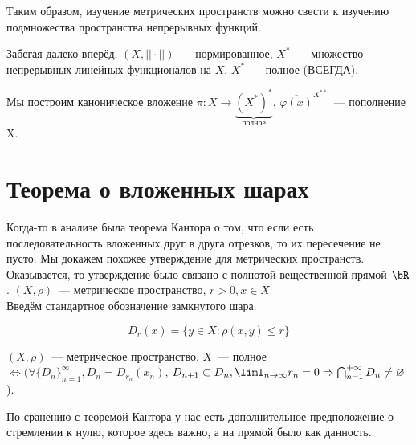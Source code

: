 \documentclass[document]{subfiles}
\begin{document}
Таким образом, изучение метрических пространств можно свести к изучению подмножества пространства непрерывных функций.
\begin{remark}
    Забегая далеко вперёд.
    $(X, || \cdot ||)$~--- нормированное, $X^*$~--- множество непрерывных линейных функционалов на $X$, $X^*$~--- полное (ВСЕГДА).

    Мы построим каноническое вложение $\pi: X \rightarrow \underbrace{(X^*)^*}_{\text{полное}}$,
    $\overline{\varphi(x)}^{X^{**}}$~--- пополнение X.
\end{remark}


\section{Теорема о вложенных шарах}

Когда-то в анализе была теорема Кантора о том, что если есть последовательность вложенных друг в друга отрезков, то их пересечение не пусто. Мы докажем похожее утверждение для метрических пространств. Оказывается, то утверждение
было связано с полнотой вещественной прямой $\bR$.
$(X, \rho)$~--- метрическое пространство, $r > 0, x \in X$ \\
Введём стандартное обозначение замкнутого шара. 

\[ D_r(x) = \{ y \in X: \rho(x,y) \leq r\}\]

\begin{theorem}
    $(X, \rho)$~--- метрическое пространство. $X$~--- полное $\Leftrightarrow (\forall \{D_n \}^\infty_{n=1}, D_n = D_{r_n}(x_n)$, $D_{n+1} \subset D_n, 
    \liml_{n \to \infty} r_n = 0 \Rightarrow \bigcap^{+\infty}_{n=1} D_n \neq \varnothing$).
\end{theorem}
По сранению с теоремой Кантора у нас есть дополнительное предположение о стремлении к нулю, которое здесь важно, а на прямой было как данность.
\end{document}
